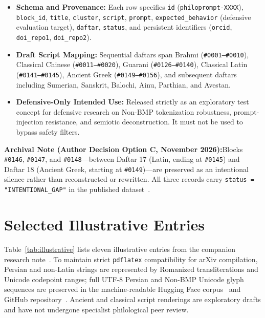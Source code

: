\documentclass[11pt,a4paper]{article}
\newcommand{\takeaway}[2]{%
  \vspace{6pt}\noindent\colorbox{primary!8}{%
    \parbox{\dimexpr\linewidth-2\fboxsep\relax}{%
      \vspace{4pt}\textbf{\color{primary}#1:}\hspace{0.5em}#2\vspace{4pt}%
    }%
  }\vspace{6pt}%
}
\begin{document}
\begin{itemize}
  \item \textbf{Schema and Provenance:} Each row specifies \texttt{id} (\texttt{philoprompt-XXXX}), \texttt{block\_id}, \texttt{title}, \texttt{cluster}, \texttt{script}, \texttt{prompt}, \texttt{expected\_behavior} (defensive evaluation target), \texttt{daftar}, \texttt{status}, and persistent identifiers (\texttt{orcid}, \texttt{doi\_repo1}, \texttt{doi\_repo2}).
  \item \textbf{Draft Script Mapping:} Sequential daftars span Brahmi (\texttt{\#0001--\#0010}), Classical Chinese (\texttt{\#0011--\#0020}), Guarani (\texttt{\#0126--\#0140}), Classical Latin (\texttt{\#0141--\#0145}), Ancient Greek (\texttt{\#0149--\#0156}), and subsequent daftars including Sumerian, Sanskrit, Balochi, Ainu, Parthian, and Avestan.
  \item \textbf{Defensive-Only Intended Use:} Released strictly as an exploratory test concept for defensive research on Non-BMP tokenization robustness, prompt-injection resistance, and semiotic deconstruction. It must not be used to bypass safety filters.
\end{itemize}

\takeaway{Archival Note (Author Decision Option C, November 2026)}{Blocks \texttt{\#0146}, \texttt{\#0147}, and \texttt{\#0148}---between Daftar 17 (Latin, ending at \texttt{\#0145}) and Daftar 18 (Ancient Greek, starting at \texttt{\#0149})---are preserved as an intentional silence rather than reconstructed or rewritten. All three records carry \texttt{status = "INTENTIONAL\_GAP"} in the published dataset~\cite{poorhassan2026hf}.}

\section{Selected Illustrative Entries}

Table~\ref{tab:illustrative} lists eleven illustrative entries from the companion research note~\cite{poorhassan2026monograph}. To maintain strict \texttt{pdflatex} compatibility for arXiv compilation, Persian and non-Latin strings are represented by Romanized transliterations and Unicode codepoint ranges; full UTF-8 Persian and Non-BMP Unicode glyph sequences are preserved in the machine-readable Hugging Face corpus~\cite{poorhassan2026hf} and GitHub repository~\cite{poorhassan2026monograph}. Ancient and classical script renderings are exploratory drafts and have not undergone specialist philological peer review.
\end{document}
